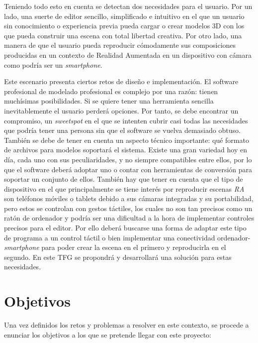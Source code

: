 Teniendo todo esto en cuenta se detectan dos necesidades para el usuario. Por un lado, una suerte de editor sencillo, simplificado e intuitivo en el que un usuario sin conocimiento o experiencia previa pueda cargar o crear modelos 3D con los que pueda construir una escena con total libertad creativa. Por otro lado, una manera de que el usuario pueda reproducir cómodamente sus composiciones producidas en un contexto de Realidad Aumentada en un dispositivo con cámara como podría ser un \textit{smartphone}.

Este escenario presenta ciertos retos de diseño e implementación. El software profesional de modelado profesional es complejo por una razón: tienen muchísimas posibilidades. Si se quiere tener una herramienta sencilla inevitablemente el usuario perderá opciones. Por tanto, se debe encontrar un compromiso, un \textit{sweetspot} en el que se intenten cubrir casi todas las necesidades que podría tener una persona sin que el software se vuelva demasiado obtuso. También se debe de tener en cuenta un aspecto técnico importante: qué formato de archivos para modelos soportará el sistema. Existe una gran variedad hoy en día, cada uno con sus peculiaridades, y no siempre compatibles entre ellos, por lo que el software deberá adoptar uno o contar con herramientas de conversión para soportar un conjunto de ellos. También hay que tener en cuenta que el tipo de dispositivo en el que principalmente se tiene interés por reproducir escenas \textit{RA} son teléfonos móviles o tablets debido a sus cámaras integradas y su portabilidad, pero estos se controlan con gestos táctiles, los cuales no son tan precisos como un ratón de ordenador y podría ser una dificultad a la hora de implementar controles precisos para el editor. Por ello deberá buscarse una forma de adaptar este tipo de programa a un control táctil o bien implementar una conectividad ordenador-\textit{smartphone} para poder crear la escena en el primero y reproducirla en el segundo. En este TFG se propondrá y desarrollará una solución para estas necesidades.

\section{Objetivos}

Una vez definidos los retos y problemas a resolver en este contexto, se procede a enunciar los objetivos a los que se pretende llegar con este proyecto:

